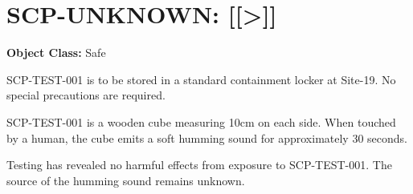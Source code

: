 \section{SCP-UNKNOWN: [[\textgreater{}]]}

\textbf{Object Class:} Safe

\containment

SCP-TEST-001 is to be stored in a standard containment locker at Site-19. No special precautions are required.

\scpdescription

SCP-TEST-001 is a wooden cube measuring 10cm on each side. When touched by a human, the cube emits a soft humming sound for approximately 30 seconds.

Testing has revealed no harmful effects from exposure to SCP-TEST-001. The source of the humming sound remains unknown.

